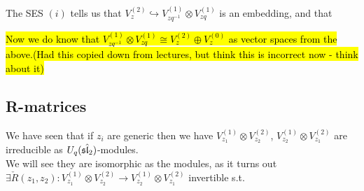 \documentclass{article}
\begin{document}
\begin{remark}
The SES $(i)$ tells us that $V_z^{(2)} \hookrightarrow V_{zq^{-1}}^{(1)} \otimes V_{zq}^{(1)}$ is an embedding, and that 
\end{remark}

\hl{Now we do know that $V_{zq^{-1}}^{(1)} \otimes V_{zq}^{(1)} \cong V_z^{(2)} \oplus V_z^{(0)}$ as vector spaces from the above.(Had this copied down from lectures, but think this is incorrect now - think about it)}  

\subsection{R-matrices}

We have seen that if $z_i$ are generic then we have $V_{z_1}^{(1)} \otimes V_{z_2}^{(2)}$, $V_{z_2}^{(1)} \otimes V_{z_1}^{(2)}$ are irreducible as $U_q(\hat{\mathfrak{sl}_2})$-modules. \\
We will see they are isomorphic as the modules, as it turns out $\exists \check{R}(z_1, z_2) : V_{z_1}^{(1)} \otimes V_{z_2}^{(2)} \to V_{z_2}^{(1)} \otimes V_{z_1}^{(2)}$ invertible s.t. 
\end{document}
